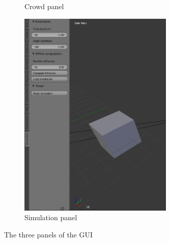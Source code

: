 \begin{figure}
\begin{subfigure}[t]{0.2\textwidth}
    \caption{Crowd panel}
  \end{subfigure} %
  \begin{subfigure}[t]{0.5\textwidth}
    \includegraphics[height=10cm]{img/GUI_simulation_example.png}
    \caption{Simulation panel}
  \end{subfigure}
  \caption{The three panels of the GUI}
\end{figure}
  